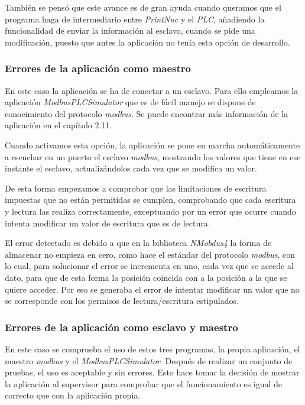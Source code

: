 \documentclass[pdftex,11pt,a4paper]{book}
\begin{document}
También se pensó que este avance es de gran ayuda cuando queramos que el programa haga de intermediario entre \emph{PrintNuc} y el \emph{PLC}, añadiendo la funcionalidad de enviar la información al esclavo, cuando se pide una modificación, puesto que antes la aplicación no tenía esta opción de desarrollo.

\subsubsection{Errores de la aplicación como maestro}

En este caso la aplicación se ha de conectar a un esclavo. Para ello empleamos la aplicación \emph{ModbusPLCSimulator} que es de fácil manejo se dispone de conocimiento del protocolo \emph{modbus}. Se puede encontrar más información de la aplicación en el capítulo 2.11.

Cuando activamos esta opción, la aplicación se pone en marcha automáticamente a escuchar en un puerto el esclavo \emph{modbus}, mostrando los valores que tiene en ese instante el esclavo, actualizándolos cada vez que se modifica un valor.

De esta forma empezamos a comprobar que las limitaciones de escritura impuestas que no están permitidas se cumplen, comprobando que cada escritura y lectura las realiza correctamente, exceptuando por un error que ocurre cuando intenta modificar un valor de escritura que es de lectura.

El error detectado es debido a que en la biblioteca \emph{NMobdus4} la forma de almacenar no empieza en cero, como hace el estándar del protocolo \emph{modbus}, con lo cual, para solucionar el error se incrementa en uno, cada vez que se accede al dato, para que de esta forma la posición coincida con a la posición a la que se quiere acceder. Por eso se generaba el error de intentar modificar un valor que no se corresponde con los permisos de lectura/escritura estipulados.

\subsubsection{Errores de la aplicación como esclavo y maestro}

En este caso se comprueba el uso de estos tres programas, la propia aplicación, el maestro \emph{modbus} y el \emph{ModbusPLCSimulator}. Después de realizar un conjunto de pruebas, el uso es aceptable y sin errores. Esto hace tomar la decisión de mostrar la aplicación al supervisor para comprobar que el funcionamiento es igual de correcto que con la aplicación propia.
\end{document}
